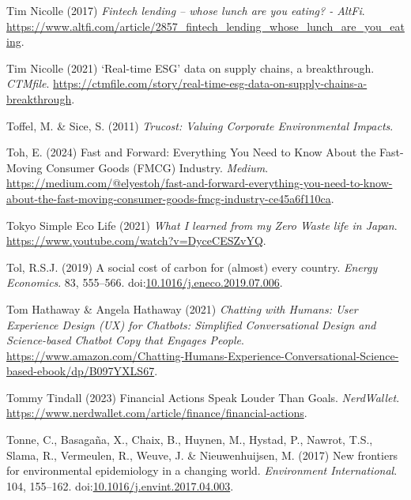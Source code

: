 \documentclass[
  letterpaper,
  DIV=11,
  numbers=noendperiod]{scrartcl}
\newlength{\cslhangindent}
\newenvironment{CSLReferences}[2] %
 {\begin{list}{}{%
  \setlength{\itemindent}{0pt}
  \setlength{\leftmargin}{0pt}
  \setlength{\parsep}{0pt}
  \ifodd #1
   \setlength{\leftmargin}{\cslhangindent}
   \setlength{\itemindent}{-1\cslhangindent}
  \fi
  \setlength{\itemsep}{#2\baselineskip}}}
 {\end{list}}
\begin{document}
\begin{CSLReferences}{0}{1}
Tim Nicolle (2017) \emph{Fintech lending -- whose lunch are you eating?
- {AltFi}}.
\url{https://www.altfi.com/article/2857_fintech_lending_whose_lunch_are_you_eating}.

Tim Nicolle (2021) {`{Real-time ESG}'} data on supply chains, a
breakthrough. \emph{CTMfile}.
\url{https://ctmfile.com/story/real-time-esg-data-on-supply-chains-a-breakthrough}.

Toffel, M. \& Sice, S. (2011) \emph{Trucost: {Valuing Corporate
Environmental Impacts}}.

Toh, E. (2024) Fast and {Forward}: {Everything You Need} to {Know About}
the {Fast-Moving Consumer Goods} ({FMCG}) {Industry}. \emph{Medium}.
\url{https://medium.com/@elyestoh/fast-and-forward-everything-you-need-to-know-about-the-fast-moving-consumer-goods-fmcg-industry-ce45a6f110ca}.

Tokyo Simple Eco Life (2021) \emph{What {I} learned from my {Zero Waste}
life in {Japan}}. \url{https://www.youtube.com/watch?v=DyceCESZvYQ}.

Tol, R.S.J. (2019) A social cost of carbon for (almost) every country.
\emph{Energy Economics}. 83, 555--566.
doi:\href{https://doi.org/10.1016/j.eneco.2019.07.006}{10.1016/j.eneco.2019.07.006}.

Tom Hathaway \& Angela Hathaway (2021) \emph{Chatting with {Humans}:
{User Experience Design} ({UX}) for {Chatbots}: {Simplified
Conversational Design} and {Science-based Chatbot Copy} that {Engages
People}}.
\url{https://www.amazon.com/Chatting-Humans-Experience-Conversational-Science-based-ebook/dp/B097YXLS67}.

Tommy Tindall (2023) Financial {Actions Speak Louder Than Goals}.
\emph{NerdWallet}.
\url{https://www.nerdwallet.com/article/finance/financial-actions}.

Tonne, C., Basagaña, X., Chaix, B., Huynen, M., Hystad, P., Nawrot,
T.S., Slama, R., Vermeulen, R., Weuve, J. \& Nieuwenhuijsen, M. (2017)
New frontiers for environmental epidemiology in a changing world.
\emph{Environment International}. 104, 155--162.
doi:\href{https://doi.org/10.1016/j.envint.2017.04.003}{10.1016/j.envint.2017.04.003}.


\end{CSLReferences}
\end{document}
